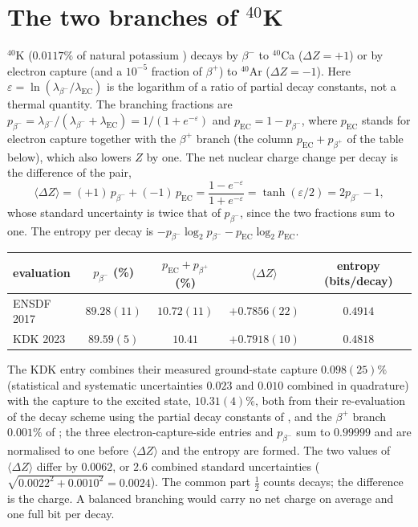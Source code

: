 \documentclass[11pt]{article}
\theoremstyle{definition}\newtheorem{definition}[theorem]{Definition}
\theoremstyle{remark}\newtheorem{remark}[theorem]{Remark}
\begin{document}
\section{The two branches of \texorpdfstring{${}^{40}$K}{40K}}\label{sec:k40}
${}^{40}$K ($0.0117\%$ of natural potassium \cite{Meija}) decays by $\beta^-$ to ${}^{40}$Ca ($\Delta Z=+1$) or by electron capture (and a $10^{-5}$ fraction of $\beta^+$) to ${}^{40}$Ar ($\Delta Z=-1$). Here $\varepsilon=\ln(\lambda_{\beta^-}/\lambda_{\mathrm{EC}})$ is the logarithm of a ratio of partial decay constants, not a thermal quantity. The branching fractions are $p_{\beta^-}=\lambda_{\beta^-}/(\lambda_{\beta^-}+\lambda_{\mathrm{EC}})=1/(1+e^{-\varepsilon})$ and $p_{\mathrm{EC}}=1-p_{\beta^-}$, where $p_{\mathrm{EC}}$ stands for electron capture together with the $\beta^+$ branch (the column $p_{\mathrm{EC}}+p_{\beta^+}$ of the table below), which also lowers $Z$ by one. The net nuclear charge change per decay is the difference of the pair,
\[
\langle\Delta Z\rangle=(+1)\,p_{\beta^-}+(-1)\,p_{\mathrm{EC}}=\frac{1-e^{-\varepsilon}}{1+e^{-\varepsilon}}=\tanh(\varepsilon/2)=2p_{\beta^-}-1,
\]
whose standard uncertainty is twice that of $p_{\beta^-}$, since the two fractions sum to one. The entropy per decay is $-p_{\beta^-}\log_2p_{\beta^-}-p_{\mathrm{EC}}\log_2p_{\mathrm{EC}}$.
\begin{center}\small
\begin{tabular}{@{}lcccc@{}}\toprule
evaluation & $p_{\beta^-}$ (\%) & $p_{\mathrm{EC}}+p_{\beta^+}$ (\%) & $\langle\Delta Z\rangle$ & entropy (bits/decay)\\\midrule
ENSDF 2017 \cite{Chen} & $89.28(11)$ & $10.72(11)$ & $+0.7856(22)$ & $0.4914$\\
KDK 2023 \cite{KDK,Kossert} & $89.59(5)$ & $10.41$ & $+0.7918(10)$ & $0.4818$\\\bottomrule
\end{tabular}
\end{center}
The KDK entry combines their measured ground-state capture $0.098(25)\%$ (statistical and systematic uncertainties $0.023$ and $0.010$ combined in quadrature) with the capture to the excited state, $10.31(4)\%$, both from their re-evaluation of the decay scheme using the partial decay constants of \cite{Kossert}, and the $\beta^+$ branch $0.001\%$ of \cite{Chen}; the three electron-capture-side entries and $p_{\beta^-}$ sum to $0.99999$ and are normalised to one before $\langle\Delta Z\rangle$ and the entropy are formed. The two values of $\langle\Delta Z\rangle$ differ by $0.0062$, or $2.6$ combined standard uncertainties ($\sqrt{0.0022^2+0.0010^2}=0.0024$). The common part $\frac12$ counts decays; the difference is the charge. A balanced branching would carry no net charge on average and one full bit per decay.
\end{document}
